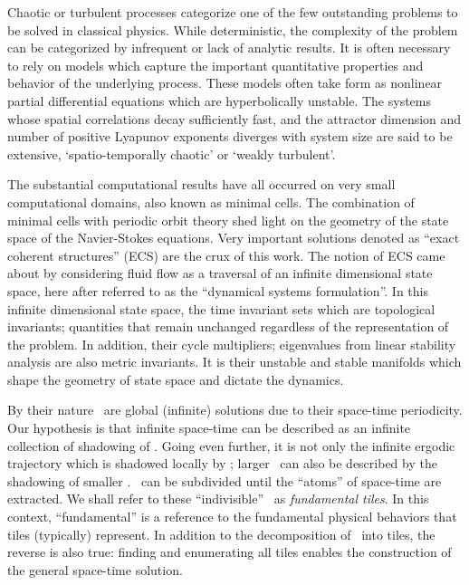Chaotic or turbulent processes categorize one of the
few outstanding problems to be solved in classical physics.
While deterministic, the complexity of the problem
can be categorized by infrequent or lack of analytic results.
It is often necessary to rely on models which capture the
important quantitative properties and behavior of the underlying
process. These models often take form as nonlinear partial
differential equations which are hyperbolically unstable.
The systems
whose spatial correlations decay sufficiently fast, and the
attractor dimension and number of positive Lyapunov exponents
diverges with system size are said
to be extensive, `spatio-temporally chaotic' or `weakly
turbulent'.

The substantial computational results have all occurred on
very small computational domains, also known as minimal cells. %
The combination of minimal cells with periodic orbit theory
shed light on the geometry of the state space of the Navier-Stokes
equations. Very important solutions denoted as ``exact coherent structures'' (ECS)
are the crux of this work.
The notion of ECS came about by considering fluid flow
as a traversal of an infinite dimensional state space, here after referred
to as the ``dynamical systems formulation''.
In this infinite dimensional state space, the time invariant sets
which are topological invariants; quantities that remain
unchanged regardless of the representation of the problem. In addition,
their cycle multipliers; eigenvalues from linear stability
analysis are also metric invariants.
It is their unstable and stable manifolds which shape the geometry of
state space and dictate the dynamics.

By their nature
\twots\ are global (infinite) solutions due to their space-time periodicity.
Our hypothesis is that infinite space-time can be described
as an infinite collection of shadowing of \twots. Going even further, it is
not only the infinite ergodic trajectory which is shadowed locally by \twots;
larger \twots\ can also be described by the shadowing of smaller \twots. \twoTs\
can be subdivided until the ``atoms'' of space-time are extracted.
We shall refer to these ``indivisible'' \twots\ as \textit{fundamental tiles}.
In this context, ``fundamental'' is a reference to the fundamental physical
behaviors that tiles (typically) represent. In addition to the decomposition
of \twots\ into tiles, the reverse is also true:
finding and enumerating all tiles enables the construction
of the general space-time solution.

